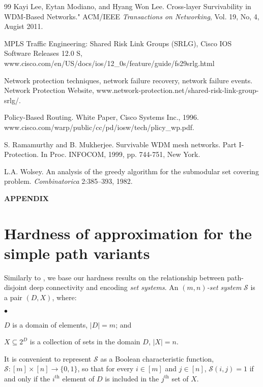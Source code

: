 \LongVersion \documentclass[11pt]{article}
\theoremstyle{definition}
\theoremstyle{plain}
\newcommand{\CalS}[0]{\mathcal{S}}
\newcounter{smallitemizec}
\newenvironment{smallitemize}
{   \setcounter{smallitemizec}{0}
    \vspace{-0.5ex}
  \begin{list}{$\bullet$}
    {\usecounter{smallitemizec}
      \setlength{\parsep}{0pt}
      \setlength{\itemsep}{0pt}}
    }{ \end{list}
   \vspace{-0.5ex}
}
\begin{document}
\begin{thebibliography}{99}
Kayi Lee, Eytan Modiano, and Hyang Won Lee.
Cross-layer Survivability in WDM-Based Networks." ACM/IEEE \emph{Transactions on Networking}, Vol. 19, No, 4, Augist 2011.

MPLS Traffic Engineering: Shared Risk Link Groups (SRLG),
Cisco IOS Software Releases 12.0 S,
www.cisco.com/en/US/docs/ios/12\_0s/feature/guide/fs29srlg.html

Network protection techniques, network failure recovery, network failure events.
Network Protection Website,
www.network-protection.net/shared-risk-link-group-srlg/.

Policy-Based Routing.
White Paper, Cisco Systems Inc., 1996. \\
www.cisco.com/warp/public/cc/pd/iosw/tech/plicy\_wp.pdf.

S. Ramamurthy and B. Mukherjee.
Survivable WDM mesh networks. Part I-Protection.
In Proc. INFOCOM, 1999, pp. 744-751, New York.

L.A. Wolsey.
An analysis of the greedy algorithm for the submodular set covering problem.
\emph{Combinatorica} 2:385--393, 1982.

\end{thebibliography}

\clearpage

\appendix

\renewcommand{\theequation}{A-\arabic{equation}}
\setcounter{equation}{0}
\begin{center}
\textbf{\large{APPENDIX}}
\end{center}

\section{Hardness of approximation for the simple path variants}
\label{appendix:Hardness}
Similarly to \cite{prev}, we base our hardness results on the relationship
between path-disjoint deep connectivity and encoding \emph{set systems}.
An \emph{$(m, n)$-set system} $\CalS$ is a pair $(D, X)$, where: 
\begin{smallitemize}
\item
$D$ is a domain of elements, $|D| = m$; and
\item 
$X \subseteq 2^D$ is a collection of sets in the domain $D$, $|X| = n$.
\end{smallitemize}
It is convenient to represent $\CalS$ as a Boolean characteristic function,
$\CalS : [m] \times [n] \rightarrow \{0, 1\}$, so that for every $i \in [m]$
and $j \in [n]$, $\CalS(i, j) = 1$ if and only if the $i^{\text{th}}$ element
of $D$ is included in the $j^{\text{th}}$ set of $X$.
\end{document}
